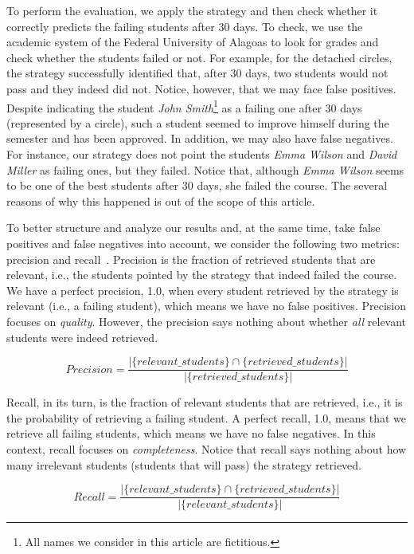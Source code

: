 To perform the evaluation, we apply the strategy and then check whether it correctly predicts the failing students after 30 days. To check, we use the academic system of the Federal University of Alagoas to look for grades and check whether the students failed or not. For example, for the detached circles, the strategy successfully identified that, after 30 days, two students would not pass and they indeed did not. Notice, however, that we may face false positives. Despite indicating the student \textit{John Smith}\footnote{All names we consider in this article are fictitious.} as a failing one after 30 days (represented by a circle), such a student seemed to improve himself during the semester and has been approved. In addition, we may also have false negatives. For instance, our strategy does not point the students \textit{Emma Wilson} and \textit{David Miller} as failing ones, but they failed. Notice that, although \textit{Emma Wilson} seems to be one of the best students after 30 days, she failed the course. The several reasons of why this happened is out of the scope of this article.

To better structure and analyze our results and, at the same time, take false positives and false negatives into account, we consider the following two metrics: precision and recall~\cite{data-mining}. Precision is the fraction of retrieved students that are relevant, i.e., the students pointed by the strategy that indeed failed the course. We have a perfect precision, 1.0, when every student retrieved by the strategy is relevant (i.e., a failing student), which means we have no false positives. Precision focuses on \textit{quality}. However, the precision says nothing about whether \textit{all} relevant students were indeed retrieved.

\vspace{0.1cm}
$$
Precision = \frac{| \{relevant\_students\} \cap \{retrieved\_students\} |}{| \{retrieved\_students\} |}
$$
\vspace{0.1cm}

Recall, in its turn, is the fraction of relevant students that are retrieved, i.e., it is the probability of retrieving a failing student. A perfect recall, 1.0, means that we retrieve all failing students, which means we have no false negatives. In this context, recall focuses on \textit{completeness}. Notice that recall says nothing about how many irrelevant students (students that will pass) the strategy retrieved.

\vspace{0.1cm}
$$
Recall = \frac{| \{relevant\_students\} \cap \{retrieved\_students\} |}{| \{relevant\_students\} |}
$$
\vspace{0.1cm}

